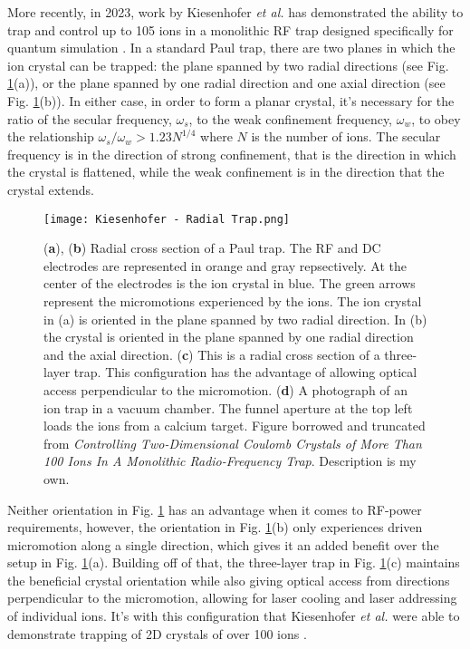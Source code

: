 More recently, in 2023, work by Kiesenhofer \textit{et al.} has demonstrated the ability to trap and control up to 105  ions in a monolithic RF trap designed specifically for quantum simulation \cite{Kiesenhofer}. In a standard Paul trap, there are two planes in which the ion crystal can be trapped: the plane spanned by two radial directions (see Fig. \ref{fig:Radial Traps}(a)), or the plane spanned by one radial direction and one axial direction (see Fig. \ref{fig:Radial Traps}(b)). In either case, in order to form a planar crystal, it's necessary for the ratio of the secular frequency, $\omega_s$, to the weak confinement frequency, $\omega_w$, to obey the relationship $\omega_s/\omega_w > 1.23 N^{1/4}$ where $N$ is the number of ions. The secular frequency is in the direction of strong confinement, that is the direction in which the crystal is flattened, while the weak confinement is in the direction that the crystal extends.
\begin{figure}
    \texttt{[image: Kiesenhofer - Radial Trap.png]}
    \caption{(\textbf{a}), (\textbf{b}) Radial cross section of a Paul trap. The RF and DC electrodes are represented in orange and gray repsectively. At the center of the electrodes is the ion crystal in blue. The green arrows represent the micromotions experienced by the ions. The ion crystal in (a) is oriented in the plane spanned by two radial direction. In (b) the crystal is oriented in the plane spanned by one radial direction and the axial direction. (\textbf{c}) This is a radial cross section of a three-layer trap. This configuration has the advantage of allowing optical access perpendicular to the micromotion. (\textbf{d}) A photograph of an ion trap in a vacuum chamber. The funnel aperture at the top left loads the ions from a calcium target. Figure borrowed and truncated from \textit{Controlling Two-Dimensional Coulomb Crystals of More Than 100 Ions In A Monolithic Radio-Frequency Trap}. Description is my own.}
    \label{fig:Radial Traps}
\end{figure} 

Neither orientation in Fig. \ref{fig:Radial Traps} has an advantage when it comes to RF-power requirements, however, the orientation in Fig. \ref{fig:Radial Traps}(b) only experiences driven micromotion along a single direction, which gives it an added benefit over the setup in Fig. \ref{fig:Radial Traps}(a). Building off of that, the three-layer trap in Fig. \ref{fig:Radial Traps}(c) maintains the beneficial crystal orientation while also giving optical access from directions perpendicular to the micromotion, allowing for laser cooling and laser addressing of individual ions. It's with this configuration that Kiesenhofer \textit{et al.} were able to demonstrate trapping of 2D crystals of over 100 ions \cite{Kiesenhofer}.

